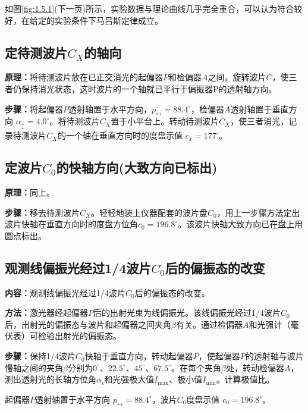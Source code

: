 \documentclass[UTF8]{ctexart}
\begin{document}
如图\ref{fig:1.5.1}(下一页)所示，实验数据与理论曲线几乎完全重合，可以认为符合较好，在给定的实验条件下马吕斯定律成立。

\subsection{定待测波片$C_X$的轴向}

\textbf{原理：}将待测波片放在已正交消光的起偏器$P$和检偏器$A$之间。旋转波片$C$，使三者仍保持消光状态，这时波片的一个轴就已平行于偏振器P的透射轴方向。

\textbf{步骤：}将起偏器$P$透射轴置于水平方向，$\overline{p_{\leftrightarrow}}= 88.4^{\circ}$，检偏器$A$透射轴置于垂直方向 $\alpha_{\updownarrow} = 4.0^{\circ}$。将待测波片$C_X$置于小平台上。转动待测波片$C_X$，使三者消光，记录待测波片$C_X$的一个轴在垂直方向时的度盘示值 $c_x = 177^{\circ}$。

\subsection{定波片$C_0$的快轴方向(大致方向已标出)}

\textbf{原理：}同上。

\textbf{步骤：}移去待测波片$C_X$。轻轻地装上仪器配套的波片盘$C_0$，用上一步骤方法定出波片快轴在垂直方向时的度盘方位角$c_0=196.8^{\circ}$。该波片快轴大致方向已在盘上用圆点标出。

\subsection{观测线偏振光经过1/4波片$C_0$后的偏振态的改变}

\textbf{内容：}观测线偏振光经过1/4波片$C_0$后的偏振态的改变。

\textbf{方法：}激光器经起偏器$P$后的出射光束为线偏振光。该线偏振光经过1/4波片$C_0$后，出射光的偏振态与波片和起偏器之间夹角$\beta$有关。通过检偏器$A$和光强计（毫伏表）可检验出射光的偏振态。

\textbf{步骤：}保持1/4波片$C_0$快轴于垂直方向，转动起偏器$P$，使起偏器$P$的透射轴与波片慢轴之间的夹角$\beta$分别为$0^{\circ}$、$22.5^{\circ}$、$45^{\circ}$、$67.5^{\circ}$。在每个夹角$\beta$处，转动检偏器$A$，测出透射光的长轴方位角$\alpha_i$和光强极大值$I_{\text{max}}$、极小值$I_{\text{min}}$。计算极值比。

起偏器$P$透射轴置于水平方向 $p_{\leftrightarrow} = 88.4^{\circ}$，波片$C_0$度盘示值 $c_0 = 196.8^{\circ}$。
\end{document}
